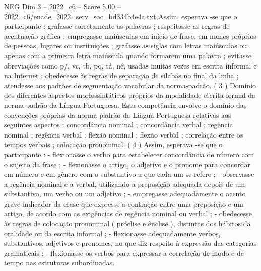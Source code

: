 \begin{textsample}{NEG Dim 3 – 2022\_c6 – Score 5.00 – 2022\_c6/enade\_2022\_serv\_soc\_bd334b4e4a.txt}
Assim, esperava -se que o participante : grafasse corretamente as palavras ; respeitasse as regras de acentuação gráfica ; empregasse maiúsculas em início de frase, em nomes próprios de pessoas, lugares ou instituições ; grafasse as siglas com letras maiúsculas ou apenas com a primeira letra maiúscula quando formarem uma palavra ; evitasse abreviações como p/, vc, tb, pq, tá, né, usadas muitas vezes em escrita informal e na Internet ; obedecesse às regras de separação de sílabas no final da linha ; atendesse aos padrões de segmentação vocabular da norma-padrão. ( 3 ) Domínio dos diferentes aspectos morfossintáticos próprios da modalidade escrita formal da norma-padrão da Língua Portuguesa.
Esta competência envolve o domínio das convenções próprias da norma padrão da Língua Portuguesa relativas aos seguintes aspectos : concordância nominal ; concordância verbal ; regência nominal ; regência verbal ; flexão nominal ; flexão verbal ; correlação entre os tempos verbais ; colocação pronominal. ( 4 ) Assim, esperava -se que o participante : - flexionasse o verbo para estabelecer concordância de número com o sujeito da frase ; - flexionasse o artigo, o adjetivo e o pronome para concordar em número e em gênero com o substantivo a que cada um se refere ; - observasse a regência nominal e a verbal, utilizando a preposição adequada depois de um substantivo, um verbo ou um adjetivo ; - empregasse adequadamente o acento grave indicador da crase que expresse a contração entre uma preposição e um artigo, de acordo com as exigências de regência nominal ou verbal ; - obedecesse às regras de colocação pronominal ( próclise e ênclise ), distintas dos hábitos da oralidade ou da escrita informal ; - flexionasse adequadamente verbos, substantivos, adjetivos e pronomes, no que diz respeito à expressão das categorias gramaticais ; - flexionasse os verbos para expressar a correlação de modo e de tempo nas estruturas subordinadas.

\end{textsample}

